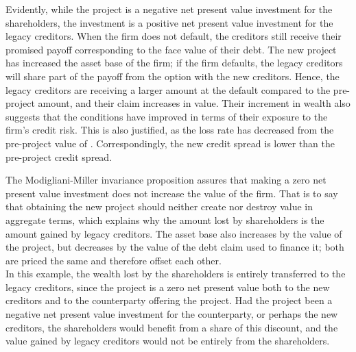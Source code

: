 \documentclass[main.tex]{subfiles}
\begin{document}
        Evidently, while the project is a negative net present value investment for the shareholders,
        the investment is a positive net present value investment for the legacy creditors.
        When the firm does not default, the creditors still receive their promised payoff 
        corresponding to the face value of their debt.
        The new project has increased the asset base of the firm; if the firm defaults, 
        the legacy creditors will share part of the payoff from the option with the new creditors.
        Hence, the legacy creditors are receiving a larger amount at the default compared to the pre-project amount, and their claim increases in value.
        Their increment in wealth also suggests that the conditions have improved in terms of their exposure to the firm's credit risk.
        This is also justified, as the loss rate has decreased from the pre-project value of .
        Correspondingly, the new credit spread is lower than the pre-project credit spread.

        The Modigliani-Miller invariance proposition assures that making a zero net present value investment 
        does not increase the value of the firm.
        That is to say that obtaining the new project should neither create nor destroy value in aggregate terms,
        which explains why the amount lost by shareholders is the amount gained by legacy creditors.
        The asset base also increases by the value of the project, 
        but decreases by the value of the debt claim used to finance it; 
        both are priced the same and therefore offset each other.
        \\
        In this example, the wealth lost by the shareholders is entirely transferred to the legacy creditors,
        since the project is a zero net present value both to the new creditors 
        and to the counterparty offering the project.
        Had the project been a negative net present value investment for the counterparty, 
        or perhaps the new creditors, the shareholders would benefit from a share of this discount,
        and the value gained by legacy creditors would not be entirely from the shareholders.
\end{document}
